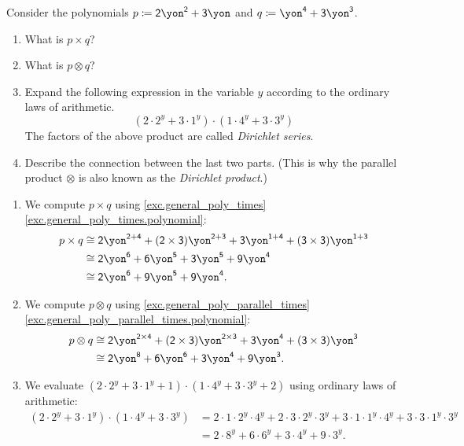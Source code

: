 \documentclass[Book-Poly]{subfiles}
\begin{document}
\begin{exercise}
  Consider the polynomials $p\coloneqq \2\yon^\2+\3\yon$ and $q\coloneqq\yon^\4+\3\yon^\3$.
  \begin{enumerate}
    \item What is $p\times q$?
    \item What is $p\otimes q$?
    \item Expand the following expression in the variable $y$ according to the ordinary laws of arithmetic.
    \[
    (2\cdot2^y+3\cdot 1^y) \cdot
    (1\cdot4^y+3\cdot 3^y)
    \]
    The factors of the above product are called \emph{Dirichlet series}.
    \item Describe the connection between the last two parts. (This is why the parallel product $\otimes$ is also known as the \emph{Dirichlet product}.) \qedhere
  \end{enumerate}
  \begin{solution}
    \begin{enumerate}
      \item We compute $p \times q$ using \cref{exc.general_poly_times} \cref{exc.general_poly_times.polynomial}:
      \begin{align*}
        p \times q &\iso \2\yon^{\2 + \4} + (\2 \times \3)\yon^{\2 + \3} + \3\yon^{\1 + \4} + (\3 \times \3)\yon^{\1 + \3} \\
        &\iso \2\yon^\6 + \6\yon^\5 + \3\yon^\5 + \9\yon^\4 \\
        &\iso \2\yon^\6 + \9\yon^\5 + \9\yon^\4.
      \end{align*}

      \item We compute $p \otimes q$ using \cref{exc.general_poly_parallel_times} \cref{exc.general_poly_parallel_times.polynomial}:
      \begin{align*}
        p \otimes q &\iso \2\yon^{\2 \times \4} + (\2 \times \3)\yon^{\2 \times \3} + \3\yon^\4 + (\3 \times \3)\yon^\3 \\
        &\iso \2\yon^\8 + \6\yon^\6 + \3\yon^\4 + \9\yon^\3.
      \end{align*}

      \item We evaluate $(2\cdot2^y+3\cdot1^y+1) \cdot
      (1\cdot4^y+3\cdot3^y+2)$ using ordinary laws of arithmetic:
      \begin{align*}
        (2\cdot2^y+3\cdot 1^y) \cdot (1\cdot4^y+3\cdot 3^y) &= 2\cdot1\cdot2^y\cdot4^y + 2\cdot3\cdot2^y\cdot3^y + 3\cdot1\cdot1^y\cdot4^y + 3\cdot3\cdot1^y\cdot3^y \\
        &= 2\cdot8^y + 6\cdot6^y + 3\cdot4^y + 9\cdot3^y.
      \end{align*}


\end{enumerate}
\end{solution}
\end{exercise}
\end{document}
